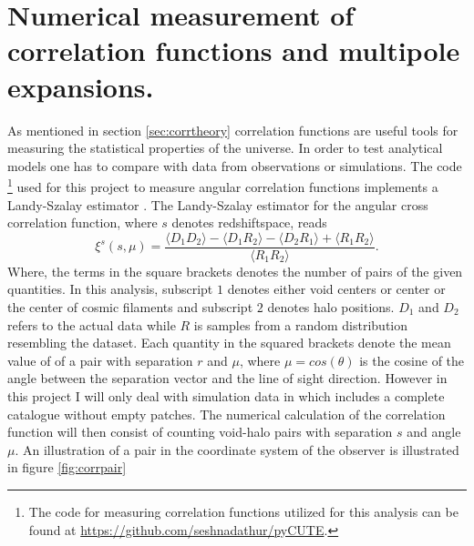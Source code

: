\section{Numerical measurement of correlation functions and multipole expansions.}\label{sec:numerical_corr}
As mentioned in section \ref{sec:corrtheory} correlation functions are useful
tools for measuring the statistical properties of the universe. In order to test
analytical models one has to compare with data from observations or simulations.
The code \footnote{The code for measuring correlation functions utilized for this analysis can be found at \url{https://github.com/seshnadathur/pyCUTE}.} used for this project to measure angular correlation functions
implements a Landy-Szalay estimator \cite{Landy}. The Landy-Szalay estimator
for the angular cross correlation function, where $s$ denotes redshiftspace, reads
\begin{equation}
    \xi^s(s,\mu)=\frac{\langle D_1D_2\rangle-\langle D_1R_2\rangle-\langle D_2R_1\rangle+\langle R_1R_2\rangle}{\langle R_1R_2\rangle}.
\end{equation}
Where, the terms in the square brackets denotes the number of pairs of the given quantities. In this analysis, subscript $1$ denotes either void centers or center or
the center of cosmic filaments and subscript $2$ denotes halo positions. $D_1$
and $D_2$ refers to the actual data while $R$ is samples from a random
distribution resembling the dataset. Each quantity in the squared brackets
denote the mean value of of a pair with separation $r$ and $\mu$, where
$\mu=cos(\theta)$ is the cosine of the angle between the separation vector and
the line of sight direction. However in this project I will only deal with simulation data in which includes a complete catalogue without empty patches.
The numerical calculation of the correlation function will then consist of counting void-halo pairs with separation $s$ and angle $\mu$.
An illustration of a pair in the coordinate system
of the observer is illustrated in figure \ref{fig:corrpair}
